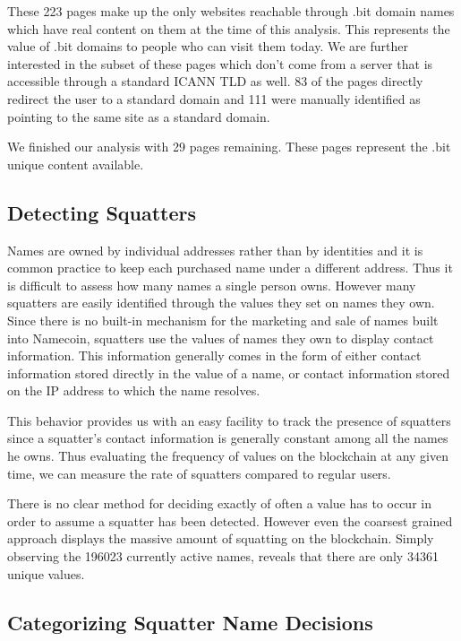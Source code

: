 These 223 pages make up the only websites reachable through .bit domain names which have real content on them at the time of this analysis. This represents the value of .bit domains to people who can visit them today. We are further interested in the subset of these pages which don't come from a server that is accessible through a standard ICANN TLD as well.  83 of the pages directly redirect the user to a standard domain and 111 were manually identified as pointing to the same site as a standard domain.

We finished our analysis with 29 pages remaining. These pages represent the .bit unique content available.

\subsection{Detecting Squatters}

Names are owned by individual addresses rather than by identities and it is common practice to keep each purchased name under a different address. Thus it is difficult to assess how many names a single person owns. However many squatters are easily identified through the values they set on names they own. Since there is no built-in mechanism for the marketing and sale of names built into Namecoin, squatters use the values of names they own to display contact information. This information generally comes in the form of either contact information stored directly in the value of a name, or contact information stored on the IP address to which the name resolves.

This behavior provides us with an easy facility to track the presence of squatters since a squatter's contact information is generally constant among all the names he owns. Thus evaluating the frequency of values on the blockchain at any given time, we can measure the rate of squatters compared to regular users.

There is no clear method for deciding exactly of often a value has to occur in order to assume a squatter has been detected. However even the coarsest grained approach displays the massive amount of squatting on the blockchain. Simply observing the 196023 currently active names, reveals that there are only 34361 unique values.

\subsection{Categorizing Squatter Name Decisions}

